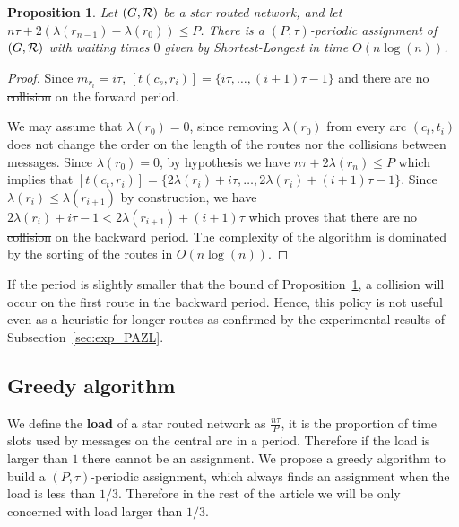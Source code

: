 \documentclass[10pt, conference, letterpaper]{IEEEtran}
\newtheorem{proposition}{Proposition}
\providecommand{\DIFaddtex}[1]{{\protect\color{blue}\uwave{#1}}} %
\providecommand{\DIFdeltex}[1]{{\protect\color{red}\sout{#1}}}                      %
\providecommand{\DIFaddbegin}{} %
\providecommand{\DIFaddend}{} %
\providecommand{\DIFdelbegin}{} %
\providecommand{\DIFdelend}{} %
\providecommand{\DIFadd}[1]{\texorpdfstring{\DIFaddtex{#1}}{#1}} %
\providecommand{\DIFdel}[1]{\texorpdfstring{\DIFdeltex{#1}}{}} %
\newcommand{\DIFscaledelfig}{0.5}
\newlength{\DIFdelgraphicswidth} %
\newlength{\DIFdelgraphicsheight} %
\newcommand{\DIFaddincludegraphics}[2][]{{\color{blue}\fbox{\DIFOincludegraphics[#1]{#2}}}} %
\newcommand{\DIFdelincludegraphics}[2][]{%
\sbox{\DIFdelgraphicsbox}{\DIFOincludegraphics[#1]{#2}}%
\settoboxwidth{\DIFdelgraphicswidth}{\DIFdelgraphicsbox} %
\settoboxtotalheight{\DIFdelgraphicsheight}{\DIFdelgraphicsbox} %
\scalebox{\DIFscaledelfig}{%
\parbox[b]{\DIFdelgraphicswidth}{\usebox{\DIFdelgraphicsbox}\\[-\baselineskip] \rule{\DIFdelgraphicswidth}{0em}}\llap{\resizebox{\DIFdelgraphicswidth}{\DIFdelgraphicsheight}{%
\setlength{\unitlength}{\DIFdelgraphicswidth}%
\begin{picture}(1,1)%
\thicklines\linethickness{2pt} %
{\color[rgb]{1,0,0}\put(0,0){\framebox(1,1){}}}%
{\color[rgb]{1,0,0}\put(0,0){\line( 1,1){1}}}%
{\color[rgb]{1,0,0}\put(0,1){\line(1,-1){1}}}%
\end{picture}%
}\hspace*{3pt}}} %
} %
\DeclareRobustCommand{\DIFaddbegin}{\DIFOaddbegin \let\includegraphics\DIFaddincludegraphics} %
\DeclareRobustCommand{\DIFaddend}{\DIFOaddend \let\includegraphics\DIFOincludegraphics} %
\DeclareRobustCommand{\DIFdelbegin}{\DIFOdelbegin \let\includegraphics\DIFdelincludegraphics} %
\DeclareRobustCommand{\DIFdelend}{\DIFOaddend \let\includegraphics\DIFOincludegraphics} %
\begin{document}
      
      \begin{proposition} Let $(G, {\cal R})$ be a star routed network, and let $n\tau + 2(\lambda(r_{n-1}) - \lambda(r_{0})) \leq P$. There is a $(P,\tau)$-periodic assignment of $(G, {\cal R})$ with waiting times $0$ given by Shortest-Longest in time $O(n\log(n))$.\label{prop:SL}
      \end{proposition}
      \begin{proof}
       Since $m_{r_i} = i\tau$, $[t(c_s,r_{i})] = \{i\tau,\dots, (i+1)\tau -1\}$ and there are no \DIFdelbegin \DIFdel{collision }\DIFdelend \DIFaddbegin \DIFadd{collisions }\DIFaddend on the forward period.

       
       We may assume that $\lambda(r_{0}) = 0$, since removing $\lambda(r_{0})$ from every arc $(c_t,t_i)$ does not change the order on the length of the routes nor the collisions between messages.
       Since $\lambda(r_{0}) = 0$, by hypothesis we have $n\tau + 2\lambda(r_{n}) \leq P$ which implies that
       $[t(c_t,r_{i})] = \{2 \lambda(r_{i}) + i\tau, \dots,  2 \lambda(r_{i}) + (i+1)\tau -1\}$.
       Since $ \lambda(r_{i}) \leq  \lambda(r_{i+1})$ by construction, we have  $2 \lambda(r_{i}) + i\tau -1 < 2 \lambda(r_{i+1}) + (i+1)\tau$ which proves that there are no \DIFdelbegin \DIFdel{collision }\DIFdelend \DIFaddbegin \DIFadd{collisions }\DIFaddend on the backward period. 
 The complexity of the algorithm is dominated by the sorting of the routes in $O(n\log(n))$. 
      \end{proof}

      If the period is slightly smaller that the bound of Proposition~\ref{prop:SL}, a collision will occur on the first route in the backward period. Hence, this policy is not useful even as a heuristic for longer routes as confirmed by the experimental results of Subsection~\ref{sec:exp_PAZL}. 

   
    \subsection{Greedy algorithm}

    
      We define the \textbf{load} of a star routed network as $\frac{n\tau}{P}$, it is the proportion of time slots used by messages on the central arc in a period. Therefore if the load is larger than $1$ there cannot be an assignment. We propose a greedy algorithm to build a $(P,\tau)$-periodic assignment, which always finds an assignment when the load is less than $1/3$. Therefore in the rest of the article we will be only concerned with load larger than $1/3$.
\end{document}
